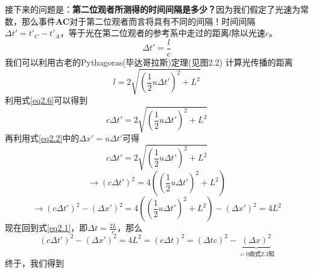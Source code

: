 接下来的问题是：{\bf{第二位观者所测得的时间间隔是多少？}}因为我们假定了光速为常数，那么事件{\bf{AC}}对于第二位观者而言将具有不同的间隔！时间间隔$\Delta t'=t'_C-t'_A$，等于光在第二位观者的参考系中走过的距离$l$除以光速$c$。
\begin{equation}\label{eq2.6}
  \Delta t'=\frac{l}{c}
\end{equation}
我们可以利用古老的Pythagoras(毕达哥拉斯)定理(见图2.2) 计算光传播的距离
\begin{equation}\label{eq2.7}
  l=2 \sqrt{\left(\frac{1}{2} u \Delta t'\right)^2+L^2}
\end{equation}
利用式\ref{eq2.6}可以得到
\begin{equation}\label{eq2.8}
  c \Delta t' =2 \sqrt{\left(\frac{1}{2} u \Delta t'\right)^2+L^2}
\end{equation}
再利用式\ref{eq2.2}中的$\Delta x'=u\Delta t'$可得
\begin{displaymath}
c \Delta t' =
  2 \sqrt{\left(\frac{1}{2} u \Delta t'\right)^2+L^2}
\end{displaymath}
\begin{displaymath}
  \rightarrow
  \left( c \Delta t' \right)^2 =
   4 \left( \left(\frac{1}{2} u \Delta t'\right)^2+L^2 \right)
\end{displaymath}
\begin{equation}\label{eq2.9}
\rightarrow
\left( c \Delta t' \right)^2
-\left(\Delta x' \right)^2=
4 \left( \left(\frac{1}{2} u \Delta t'\right)^2+L^2 \right)
-\left(\Delta x' \right)^2 =4L^2
\end{equation}
 现在回到式\ref{eq2.1}，即$\Delta t =\frac{2L}{c}$，那么
\begin{equation}\label{eq2.10}
 \left( c \Delta t' \right)^2
 -\left(\Delta x' \right)^2
 =4 L^2
 =\left( c \Delta t \right)^2
 =\left( \Delta t c \right)^2
 -
 \!\!\!
 \underbrace{\left(\Delta x \right)^2}_{=0 \text{由式}2.3 \text{知}}
\end{equation}
终于，我们得到

